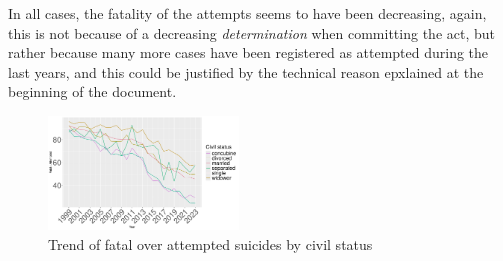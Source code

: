 \documentclass{article}
\begin{document}
In all cases, the fatality of the attempts seems to have been decreasing, again,
this is not because of a decreasing \textit{determination} when committing the act,
but rather because many more cases have been registered as attempted during the last years,
and this could be justified by the technical reason epxlained at the beginning of the document.
\begin{figure}[H]
    \centering
    \includegraphics[width=0.45\textwidth]{imgs/status_foa.pdf}
    \caption{Trend of fatal over attempted suicides by civil status }
	\label{fig:status_foa}
\end{figure}
\end{document}

